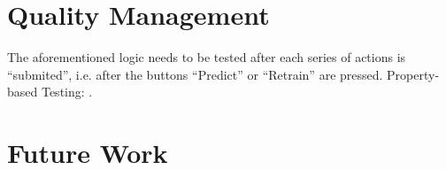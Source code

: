 \documentclass[12p3, letterpaper, twoside]{article}
\begin{document}
\section{Quality Management}
\label{Quality Management}

The aforementioned logic needs to be tested after each series of actions is ``submited'', i.e. after the buttons ``Predict'' or ``Retrain'' are pressed. Property-based Testing: \cite{Saranti:2020:PropertyBasedTesting}.

\section{Future Work}
\label{Future Work}




\end{document}
